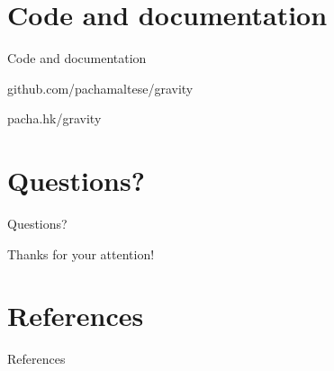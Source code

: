 \documentclass[ignorenonframetext,compress,aspectratio=169]{beamer}
\newif\ifbibliography
\begin{document}
\section{Code and documentation}\label{code-and-documentation}

\begin{frame}{Code and documentation}

\LARGE{github.com/pachamaltese/gravity}

\LARGE{pacha.hk/gravity}

\end{frame}

\section{Questions?}\label{questions}

\begin{frame}{Questions?}

\LARGE{Thanks for your attention!}

\end{frame}

\section{References}\label{references}

\begin{frame}{References}

\end{frame}

\begin{frame}[allowframebreaks]{}
\bibliographytrue

\end{frame}
\end{document}
